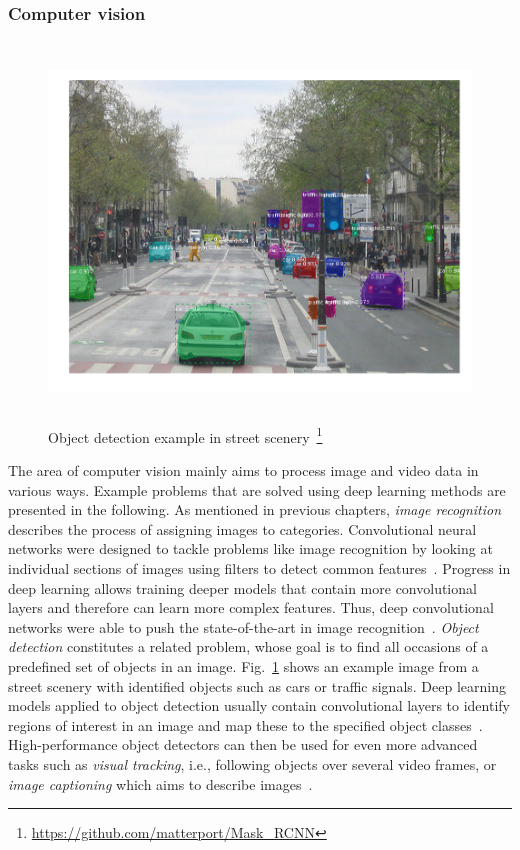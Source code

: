 \subsubsection{Computer vision}
\label{sub:dl_app_cv}

\begin{figure}[h]
  \centering
  \includegraphics[height=10cm]{img/mask_rcnn}
  \caption[Object detection example]{Object detection example in street scenery~\footnote{\url{https://github.com/matterport/Mask_RCNN}}}
\label{fig:obj_detection}
\end{figure}

The area of computer vision mainly aims to process image and video data in
various ways.
Example problems that are solved using deep learning methods are presented in
the following.
As mentioned in previous chapters, \textit{image recognition} describes the
process of assigning images to categories.
Convolutional neural networks were designed to tackle problems like image
recognition by looking at individual sections of images using filters to
detect common features~\cite{LeCun1998}.
Progress in deep learning allows training deeper models that contain more
convolutional layers and therefore can learn more complex features.
Thus, deep convolutional networks were able to push the state-of-the-art in image recognition~\cite{Krizhevsky2012, He2016}.
\textit{Object detection} constitutes a related problem, whose goal is
to find all occasions of a predefined set of objects in an image.
Fig.~\ref{fig:obj_detection} shows an example image from a street scenery
with identified objects such as cars or traffic signals.
Deep learning models applied to object detection usually contain convolutional
layers to identify regions of interest in an image and map these to the
specified object classes~\cite{Girshick2012, He2017}.
High-performance object detectors can then be used for even more advanced
tasks such as \textit{visual tracking}, i.e., following objects over several video
frames, or \textit{image captioning} which aims to describe images~\cite{Bertinetto2016, Karpathy2017}.

